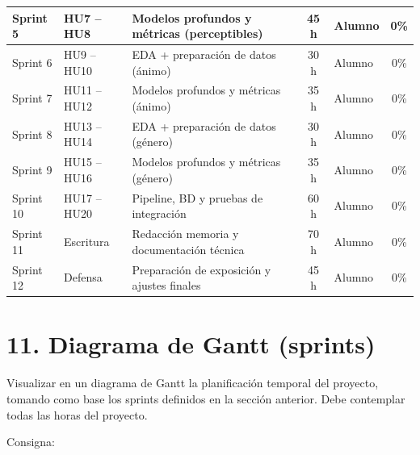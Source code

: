 \documentclass[
11pt, %
]{charter}
\begin{document}
\begin{table}[htpb]
\begin{tabularx}{\linewidth}{@{}|l|l|X|c|l|c|@{}}
Sprint 5 & HU7 – HU8 & Modelos profundos y métricas (perceptibles) & 45 h & Alumno & 0\% \\ \hline
Sprint 6 & HU9 – HU10 & EDA + preparación de datos (ánimo) & 30 h & Alumno & 0\% \\ \hline
Sprint 7 & HU11 – HU12 & Modelos profundos y métricas (ánimo) & 35 h & Alumno & 0\% \\ \hline
Sprint 8 & HU13 – HU14 & EDA + preparación de datos (género) & 30 h & Alumno & 0\% \\ \hline
Sprint 9 & HU15 – HU16 & Modelos profundos y métricas (género) & 35 h & Alumno & 0\% \\ \hline
Sprint 10 & HU17 – HU20 & Pipeline, BD y pruebas de integración & 60 h & Alumno & 0\% \\ \hline
Sprint 11 & Escritura & Redacción memoria y documentación técnica & 70 h & Alumno & 0\% \\ \hline
Sprint 12 & Defensa & Preparación de exposición y ajustes finales & 45 h & Alumno & 0\% \\ \hline

\end{tabularx}
\end{table}



\section{11. Diagrama de Gantt (sprints)}
\label{sec:gantt}

Visualizar en un diagrama de Gantt la planificación temporal del proyecto, tomando como base los sprints definidos en la sección anterior. Debe contemplar todas las horas del proyecto.

Consigna:
\end{document}
